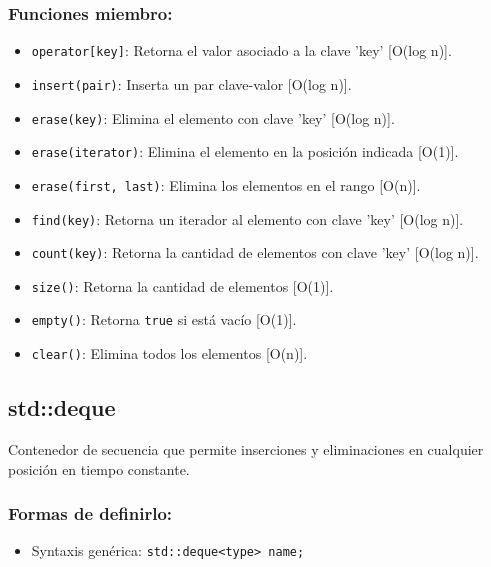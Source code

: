 \subsubsection{Funciones miembro:}
\begin{itemize}
  \item \texttt{operator[key]}: Retorna el valor asociado a la clave 'key' [O(log n)].
  \item \texttt{insert(pair)}: Inserta un par clave-valor [O(log n)]. 
  \item \texttt{erase(key)}: Elimina el elemento con clave 'key' [O(log n)].
  \item \texttt{erase(iterator)}: Elimina el elemento en la posición indicada [O(1)].
  \item \texttt{erase(first, last)}: Elimina los elementos en el rango [O(n)].
  \item \texttt{find(key)}: Retorna un iterador al elemento con clave 'key' [O(log n)]. 
  \item \texttt{count(key)}: Retorna la cantidad de elementos con clave 'key' [O(log n)]. 
  \item \texttt{size()}: Retorna la cantidad de elementos [O(1)]. 
  \item \texttt{empty()}: Retorna \texttt{true} si está vacío [O(1)]. 
  \item \texttt{clear()}: Elimina todos los elementos [O(n)]. 
\end{itemize}

\subsection{std::deque}
\label{subsec:std_deque}
Contenedor de secuencia que permite inserciones y eliminaciones en cualquier posición en tiempo constante.

\subsubsection{Formas de definirlo:}
\begin{itemize}
  \item Syntaxis genérica: \texttt{std::deque<type> name;}
\end{itemize}

